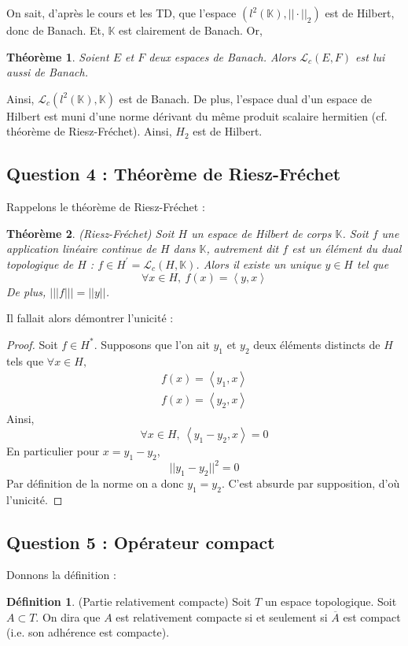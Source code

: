 \documentclass[a4paper,11pt]{article}
\theoremstyle{plain}
\newtheorem*{theo}{Théorème}
\theoremstyle{definition}
\newtheorem*{defi}{Définition}
\begin{document}
On sait, d'après le cours et les TD, que l'espace $\left(l^2\left(\mathbb{K}\right), ||\cdot||_{2}\right)$ est de Hilbert, donc de Banach.
Et, $\mathbb{K}$ est clairement de Banach.
Or,
\begin{theo}
Soient $E$ et $F$ deux espaces de Banach.
Alors $\mathcal{L}_{c}(E,F)$ est lui aussi de Banach.
\end{theo}
Ainsi, $\mathcal{L}_{c}\left(l^2\left(\mathbb{K}\right), \mathbb{K}\right)$ est de Banach.
De plus, l'espace dual d'un espace de Hilbert est muni d'une norme dérivant du même produit scalaire hermitien (cf. théorème de Riesz-Fréchet).
Ainsi, $H_2$ est de Hilbert.

\subsection*{Question 4 : Théorème de Riesz-Fréchet}
Rappelons le théorème de Riesz-Fréchet :
\begin{theo} (Riesz-Fréchet)
Soit $H$ un espace de Hilbert de corps $\mathbb{K}$.
Soit $f$ une application linéaire continue de $H$ dans $\mathbb{K}$, autrement dit $f$ est un élément du dual topologique de $H$ : $f \in H^{'} = \mathcal{L}_{c} \left(H,\mathbb{K}\right)$.
Alors il existe un unique $y \in H$ tel que 
\[
	\forall x \in H, \ f(x) = \left<y,x\right>
\]
De plus, $|||f||| = ||y||$.
\end{theo}

Il fallait alors démontrer l'unicité :
\begin{proof}
Soit $f \in H^*$.
Supposons que l'on ait $y_1$ et $y_2$ deux éléments distincts de $H$ tels que $\forall x \in H,$
\[\begin{aligned}
 f(x) = \left<y_1,x\right>\\
 f(x) = \left<y_2,x\right>
\end{aligned}
\]
Ainsi, 
\[
	\forall x \in H, \ \left<y_1-y_2,x\right> = 0
\]
En particulier pour $x = y_1 - y_2$, 
\[
	||y_1 - y_2||^2 = 0
\]
Par définition de la norme on a donc $y_1 = y_2$.
C'est absurde par supposition, d'où l'unicité.
\end{proof}

\subsection*{Question 5 : Opérateur compact}
Donnons la définition :
\begin{defi} (Partie relativement compacte)
Soit $T$ un espace topologique.
Soit $A \subset T$.
On dira que $A$ est relativement compacte si et seulement si $\overline{A}$ est compact (i.e. son adhérence est compacte).
\end{defi}
\end{document}
